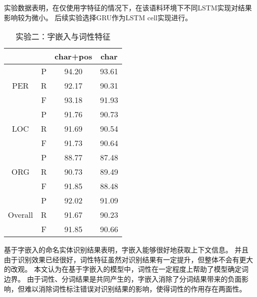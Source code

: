 实验数据表明，在仅使用字特征的情况下，在该语料环境下不同LSTM实现对结果影响较为微小。
后续实验选择GRU作为LSTM cell实现进行。

\begin{table}[H]
    \centering
    \caption{实验二：字嵌入与词性特征}
    \begin{tabular}{cccc}
        \toprule
        & & char+pos & char\\
        \midrule
        \multirow{3}{*}{PER} & P & 94.20 & 93.61\\
        & R & 92.17 & 90.31\\
        & F & 93.18 & 91.93 \\
        \midrule
        \multirow{3}{*}{LOC} & P & 91.76 & 90.73\\
        & R & 91.69 & 90.54 \\
        & F & 91.73 & 90.64\\
        \midrule
        \multirow{3}{*}{ORG} & P & 88.77 & 87.48\\
        & R & 90.73 & 89.49\\
        & F & 91.85 & 88.48\\
        \midrule
        \multirow{3}{*}{Overall} & P & 92.02 & 91.09\\
        & R & 91.67 & 90.23\\
        & F & 91.85 & 90.66\\
        \bottomrule
    \end{tabular}
    \label{tab:char-comparison}
\end{table}
基于字嵌入的命名实体识别结果表明，字嵌入能够很好地获取上下文信息。
并且由于识别效果已经很好，词性特征虽然对识别结果有一定提升，但整体不会有更大的改观。
本文认为在基于字嵌入的模型中，词性在一定程度上帮助了模型确定词边界。
由于词性、分词结果是共同产生的，字嵌入消除了分词结果带来的负面影响，但难以消除词性标注错误对识别结果的影响，使得词性的作用存在两面性。

